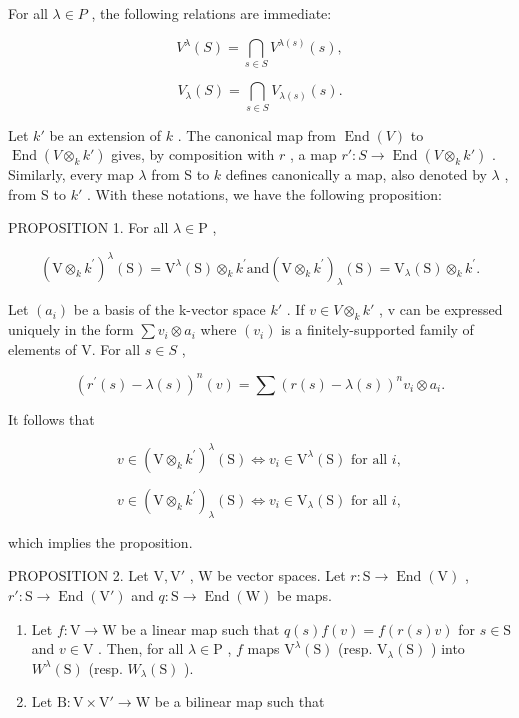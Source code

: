 For all \(\lambda\in P\) , the following relations are immediate:

\[
V ^ {\lambda} (S) = \bigcap_ {s \in S} V ^ {\lambda (s)} (s),\tag{1}
\]

\[
V _ {\lambda} (S) = \bigcap_ {s \in S} V _ {\lambda (s)} (s).\tag{2}
\]

Let \(k'\) be an extension of \(k\) . The canonical map from \(\operatorname{End}(V)\) to \(\operatorname{End}(V \otimes_k k')\) gives, by composition with \(r\) , a map \(r' : S \to \operatorname{End}(V \otimes_k k')\) . Similarly, every map \(\lambda\) from S to \(k\) defines canonically a map, also denoted by \(\lambda\) , from S to \(k'\) . With these notations, we have the following proposition:

PROPOSITION 1. For all \(\lambda \in \mathrm{P}\) ,

\[
(\mathrm{V} \otimes_ {k} k ^ {\prime}) ^ {\lambda} (\mathrm{S}) = \mathrm{V} ^ {\lambda} (\mathrm{S}) \otimes_ {k} k ^ {\prime} \text {and} (\mathrm{V} \otimes_ {k} k ^ {\prime}) _ {\lambda} (\mathrm{S}) = \mathrm{V} _ {\lambda} (\mathrm{S}) \otimes_ {k} k ^ {\prime}.
\]

Let \((a_{i})\) be a basis of the k-vector space \(k'\) . If \(v \in V \otimes_{k} k'\) , v can be expressed uniquely in the form \(\sum v_{i} \otimes a_{i}\) where \((v_{i})\) is a finitely-supported family of elements of V. For all \(s \in S\) ,

\[
(r ^ {\prime} (s) - \lambda (s)) ^ {n} (v) = \sum (r (s) - \lambda (s)) ^ {n} v _ {i} \otimes a _ {i}.
\]

It follows that

\[
v \in (\mathrm{V} \otimes_ {k} k ^ {\prime}) ^ {\lambda} (\mathrm{S}) \Longleftrightarrow v _ {i} \in \mathrm{V} ^ {\lambda} (\mathrm{S}) \text { for   all } i,
\]

\[
v \in (\mathrm{V} \otimes_ {k} k ^ {\prime}) _ {\lambda} (\mathrm{S}) \Longleftrightarrow v _ {i} \in \mathrm{V} _ {\lambda} (\mathrm{S}) \text { for   all } i,
\]

which implies the proposition.

PROPOSITION 2. Let \(\mathrm{V}, \mathrm{V}'\) , \(\mathrm{W}\) be vector spaces. Let \(r: \mathrm{S} \to \operatorname{End}(\mathrm{V})\) , \(r': \mathrm{S} \to \operatorname{End}(\mathrm{V}')\) and \(q: \mathrm{S} \to \operatorname{End}(\mathrm{W})\) be maps.

\begin{enumerate}
\def\labelenumi{(\roman{enumi})}
\item
  Let \(f: \mathrm{V} \to \mathrm{W}\) be a linear map such that \(q(s)f(v) = f(r(s)v)\) for \(s \in \mathrm{S}\) and \(v \in \mathrm{V}\) . Then, for all \(\lambda \in \mathrm{P}\) , \(f\) maps \(\mathrm{V}^{\lambda}(\mathrm{S})\) (resp. \(\mathrm{V}_{\lambda}(\mathrm{S})\) ) into \(W^{\lambda}(\mathrm{S})\) (resp. \(W_{\lambda}(\mathrm{S})\) ).
\item
  Let \(\mathrm{B}:\mathrm{V}\times \mathrm{V}'\to \mathrm{W}\) be a bilinear map such that
\end{enumerate}

